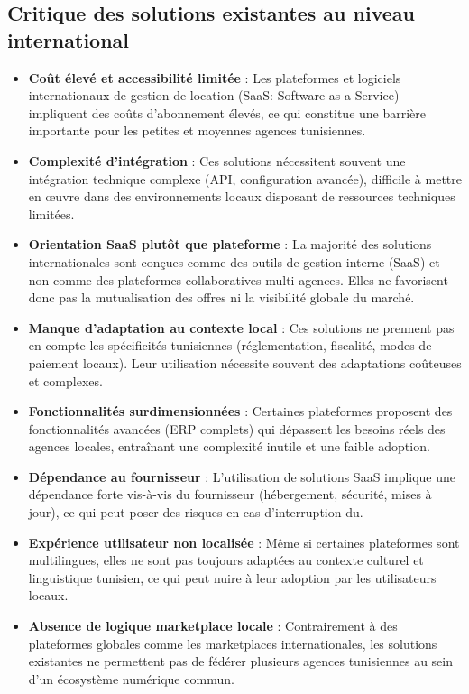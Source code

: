 \subsection{Critique des solutions existantes au niveau international}

\begin{itemize}[noitemsep, topsep=0pt]
    \item \textbf{Coût élevé et accessibilité limitée} : Les plateformes et logiciels internationaux de gestion de location (SaaS: Software as a Service) impliquent des coûts d’abonnement élevés, ce qui constitue une barrière importante pour les petites et moyennes agences tunisiennes.
    \item \textbf{Complexité d’intégration} : Ces solutions nécessitent souvent une intégration technique complexe (API, configuration avancée), difficile à mettre en œuvre dans des environnements locaux disposant de ressources techniques limitées.
    \item \textbf{Orientation SaaS plutôt que plateforme} : La majorité des solutions internationales sont conçues comme des outils de gestion interne (SaaS) et non comme des plateformes collaboratives multi-agences. Elles ne favorisent donc pas la mutualisation des offres ni la visibilité globale du marché.
    \item \textbf{Manque d’adaptation au contexte local} : Ces solutions ne prennent pas en compte les spécificités tunisiennes (réglementation, fiscalité, modes de paiement locaux). Leur utilisation nécessite souvent des adaptations coûteuses et complexes.
    \item \textbf{Fonctionnalités surdimensionnées} : Certaines plateformes proposent des fonctionnalités avancées (ERP complets) qui dépassent les besoins réels des agences locales, entraînant une complexité inutile et une faible adoption.
    \item \textbf{Dépendance au fournisseur} : L’utilisation de solutions SaaS implique une dépendance forte vis-à-vis du fournisseur (hébergement, sécurité, mises à jour), ce qui peut poser des risques en cas d’interruption du.\cite{journaldunet}
    \item \textbf{Expérience utilisateur non localisée} : Même si certaines plateformes sont multilingues, elles ne sont pas toujours adaptées au contexte culturel et linguistique tunisien, ce qui peut nuire à leur adoption par les utilisateurs locaux.
    \item \textbf{Absence de logique marketplace locale} : Contrairement à des plateformes globales comme les marketplaces internationales, les solutions existantes ne permettent pas de fédérer plusieurs agences tunisiennes au sein d’un écosystème numérique commun.
\end{itemize}

